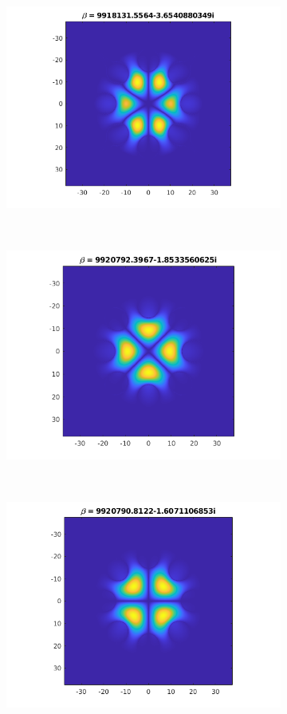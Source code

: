 \documentclass[]{article}
\begin{document}
\begin{figure}[htb]
\begin{subfigure}{0.3\textwidth}
		\includegraphics[width=\textwidth]{Figures/LP31b}
	\end{subfigure}
	~
	\begin{subfigure}{0.3\textwidth}
		\includegraphics[width=\textwidth]{Figures/LP21a}
	\end{subfigure}
	\\
	\begin{subfigure}{0.3\textwidth}
		\includegraphics[width=\textwidth]{Figures/LP21b}

\end{subfigure}
\end{figure}
\end{document}
